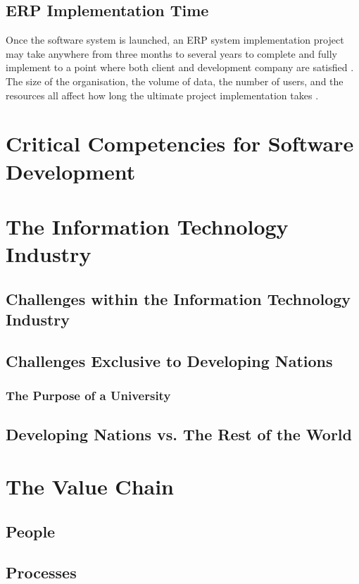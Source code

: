 \subsection{ERP Implementation Time}
\par{Once the software system is launched, an ERP system implementation project may take anywhere from three months to several years to complete and fully implement to a point where both client and development company are satisfied \citep{sankar2006implementation}. The size of the organisation, the volume of data, the number of users, and the resources all affect how long the ultimate project implementation takes \citep{pelphrey2015directing}.}

\section{Critical Competencies for Software Development}

\section{The Information Technology Industry}
\subsection{Challenges within the Information Technology Industry}
\subsection{Challenges Exclusive to Developing Nations}
\subsubsection{The Purpose of a University}
\subsection{Developing Nations vs. The Rest of the World}

\section{The Value Chain}
\subsection{People}
\subsection{Processes}
